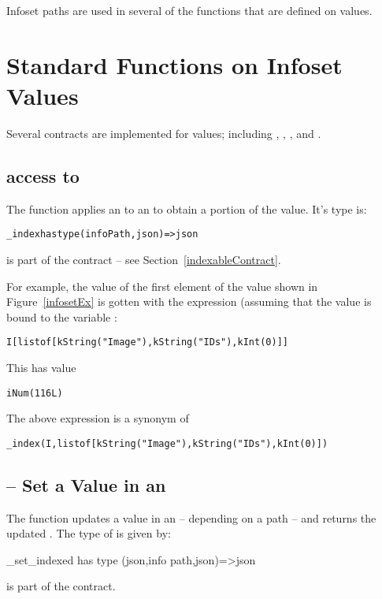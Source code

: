 Infoset paths are used in several of the functions that are defined on  values.

\section{Standard Functions on Infoset Values}
Several contracts are implemented for  values; including , , ,  and .

\subsection{ access to }

The  function applies an  to an  to obtain a portion of the  value. It's type is:
\begin{alltt}
\_index has type (infoPath,json)=>json
\end{alltt}
 is part of the  contract -- see Section~\vref{indexableContract}.

For example, the value of the first element of the value shown in Figure~\vref{infosetEx} is gotten with the expression (assuming that the value is bound to the variable :
\begin{alltt}
I[list of [kString("Image"), kString("IDs"), kInt(0)]]
\end{alltt}
This has value
\begin{alltt}
iNum(116L)
\end{alltt}

\begin{aside}
The above expression is a synonym of
\begin{alltt}
\_index(I,list of [kString("Image"), kString("IDs"), kInt(0)])
\end{alltt}
\end{aside}

\subsection{ -- Set a Value in an }

The  function updates a value in an  -- depending on a path -- and returns the updated .
The type of  is given by:
\begin{spec}
\_set\_indexed has type (json,info path,json)=>json
\end{spec}
 is part of the  contract.

